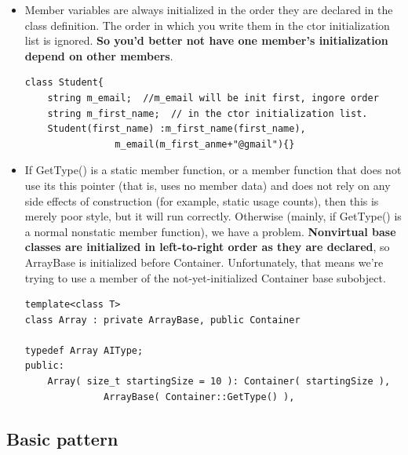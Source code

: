 \documentclass[a4paper,11pt,twoside]{book}
\begin{document}
\begin{itemize}
\item Member variables are always initialized in the order they are declared in the class definition. The order in which you write them in the ctor initialization list is ignored.  \textbf{So you'd better not have one member's initialization depend on other members}.
\begin{lstlisting}[numbers=none]
class Student{
	string m_email;  //m_email will be init first, ingore order
	string m_first_name;  // in the ctor initialization list.
	Student(first_name) :m_first_name(first_name),
                m_email(m_first_anme+"@gmail"){}
\end{lstlisting}


\item If GetType() is a static member function, or a member function that does not use its this pointer (that is, uses no member data) and does not rely on any side effects of construction (for example, static usage counts), then this is merely poor style, but it will run correctly. Otherwise (mainly, if GetType() is a normal nonstatic member function), we have a problem.
\textbf{Nonvirtual base classes are initialized in left-to-right order as they are declared}, so ArrayBase
is initialized before Container. Unfortunately, that means we're trying to use a member of the
not-yet-initialized Container base subobject.

\begin{lstlisting}[numbers=none]
template<class T>
class Array : private ArrayBase, public Container

typedef Array AIType;
public:
	Array( size_t startingSize = 10 ): Container( startingSize ), 
	          ArrayBase( Container::GetType() ),
\end{lstlisting}

\end{itemize}

\subsection{Basic pattern}
\end{document}
